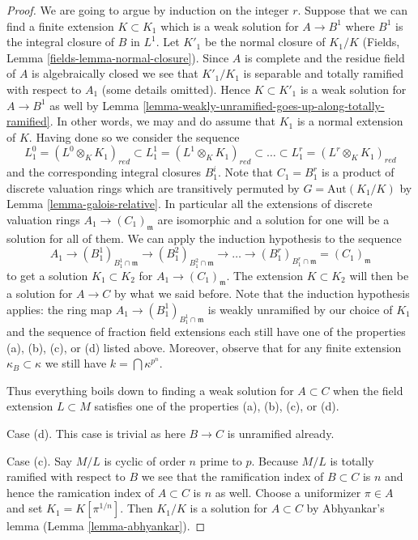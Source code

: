 \begin{proof}
\medskip\noindent
We are going to argue by induction on the integer $r$. Suppose that we
can find a finite extension $K \subset K_1$ which is a weak solution
for $A \to B^1$ where $B^1$ is the integral closure of $B$ in $L^1$.
Let $K'_1$ be the normal closure of $K_1/K$
(Fields, Lemma \ref{fields-lemma-normal-closure}).
Since $A$ is complete and the residue field of $A$ is algebraically closed
we see that $K'_1/K_1$ is separable and totally ramified with
respect to $A_1$ (some details omitted).
Hence $K \subset K'_1$ is a weak solution for $A \to B^1$ as well by
Lemma \ref{lemma-weakly-unramified-goes-up-along-totally-ramified}.
In other words, we may and do assume that $K_1$ is a normal extension of $K$.
Having done so we consider the sequence
$$
L^0_1 = (L^0 \otimes_K K_1)_{red} \subset
L^1_1 = (L^1 \otimes_K K_1)_{red} \subset \ldots \subset
L^r_1 = (L^r \otimes_K K_1)_{red}
$$
and the corresponding integral closures $B^i_1$. Note that $C_1 = B^r_1$
is a product of discrete valuation rings which are transitively permuted
by $G = \text{Aut}(K_1/K)$ by Lemma \ref{lemma-galois-relative}.
In particular all the extensions of discrete valuation rings
$A_1 \to (C_1)_\mathfrak m$ are isomorphic and a solution for one
will be a solution for all of them. We can apply the induction
hypothesis to the sequence
$$
A_1 \to (B^1_1)_{B^1_1 \cap \mathfrak m} \to
(B^2_1)_{B^2_1 \cap \mathfrak m} \to
\ldots \to
(B^r_1)_{B^r_1 \cap \mathfrak m} =
(C_1)_\mathfrak m
$$
to get a solution $K_1 \subset K_2$ for $A_1 \to (C_1)_\mathfrak m$.
The extension $K \subset K_2$ will then be a solution for $A \to C$
by what we said before. Note that the induction hypothesis applies:
the ring map $A_1 \to (B^1_1)_{B^1_1 \cap \mathfrak m}$
is weakly unramified by our choice of $K_1$
and the sequence of fraction field extensions
each still have one of the properties (a), (b), (c), or (d)
listed above. Moreover, observe that for any finite extension 
$\kappa_B \subset \kappa$ we still have $k = \bigcap \kappa^{p^n}$.

\medskip\noindent
Thus everything boils down to finding a weak solution for $A \subset C$
when the field extension $L \subset M$ satisfies one of the properties
(a), (b), (c), or (d).

\medskip\noindent
Case (d). This case is trivial as here $B \to C$ is unramified already.

\medskip\noindent
Case (c). Say $M/L$ is cyclic of order $n$ prime to $p$. Because
$M/L$ is totally ramified with respect to $B$ we see that the ramification
index of $B \subset C$ is $n$ and hence the ramication index of $A \subset C$
is $n$ as well. Choose a uniformizer $\pi \in A$ and set
$K_1 = K[\pi^{1/n}]$. Then $K_1/K$ is a solution for $A \subset C$
by Abhyankar's lemma (Lemma \ref{lemma-abhyankar}).


\end{proof}
